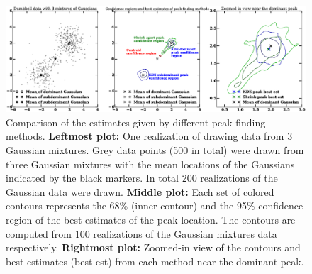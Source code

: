 \documentclass[letterpaper,useAMS,usenatbib]{mn2e}
\begin{document}
\begin{figure}
	\includegraphics[width=.95\linewidth]{confidence_regions_dumbbell_500.eps}
	\caption{Comparison of the estimates given by different peak finding methods.
		{\bf Leftmost plot:} One realization of drawing data from 3 Gaussian
		mixtures. Grey data points (500 in total) were drawn from three
		Gaussian mixtures with the mean locations of the Gaussians indicated by the
		black markers. In total 200 realizations of the Gaussian data were drawn.
		{\bf Middle plot:} Each set of colored contours represents the
		68\% (inner contour) and the 95\% confidence region of the best estimates
		of the peak location. The contours are computed from 100 realizations of the Gaussian
		mixtures data respectively. {\bf Rightmost plot:} Zoomed-in view of the
		contours and best estimates (best est) from each method near the dominant peak.  
		\label{fig:dumbbell500}}
\end{figure}
\clearpage\bsp\label{lastpage} 
\end{document}
